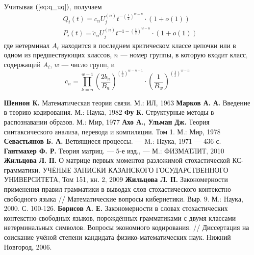 \documentclass[10pt]{article}
\begin{document}
Учитывая $(\ref{eq:q_uq})$, получаем
\begin{equation*}
	\begin{split}
		&Q_i(t) = c_n U^{(n)}_j t^{-\left(\frac{1}{2}\right)^{w-n}} \cdot (1 + o(1)) \\
		&P_i(t) = \tilde{c}_n U^{(n)}_j t^{-1 -\left(\frac{1}{2}\right)^{w-n}} \cdot (1 + o(1))
	\end{split}
\end{equation*}
где нетерминал $A_i$ находится в последнем критическом классе цепочки или в одном из предшествующих классов, $n$ --- номер группы, в которую входит класс, содержащий $A_i$, $w$ --- число групп, и
\begin{equation*}
	c_n = \prod_{k = n}^{w - 1} \left(\frac{2 b_n}{B_n}\right)^{\left(\frac{1}{2}\right)^{w - n + 1}} \cdot \left(\frac{1}{B_w}\right)^{\left(\frac{1}{2}\right)^{w - n}}
\end{equation*}


\newpage

\begin{thebibliography}{99}
	\textbf{Шеннон К.} Математическая теория связи. М.: ИЛ, 1963
	\textbf{Марков А. А.} Введение в теорию кодирования. М.: Наука, 1982
	\textbf{Фу К.} Структурные методы в распознавании образов. М.: Мир, 1977
	\textbf{Ахо А., Ульман Дж.} Теория синтаксического анализа, перевода и компиляции. Том 1. М.: Мир, 1978
	\textbf{Севастьянов Б. А.} Ветвящиеся процессы. --- M.: Наука, 1971 --- 436 с.
	\textbf{Гантмахер Ф. Р.} Теория матриц. --- 5-е изд., --- М.: ФИЗМАТЛИТ, 2010
	\textbf{Жильцова Л. П.} О матрице первых моментов разложимой стохастической КС-грамматики. УЧЁНЫЕ ЗАПИСКИ КАЗАНСКОГО ГОСУДАРСТВЕННОГО УНИВЕРСИТЕТА, Том 151, кн. 2, 2009
	\textbf{Жильцова Л. П.} Закономерности применения правил грамматики в выводах слов стохастического контекстно-свободного языка // Математические вопросы кибернетики. Выр. 9. М.: Наука, 2000. С. 100-126.
	\textbf{Борисов А. Е.} Закономерности в словах стохастических контекстно-свободных языков, порождённых грамматиками с двумя классами нетерминальных символов. Вопросы экономного кодирования. // Диссертация на соискание учёной степени кандидата физико-математических наук. Нижний Новгород, 2006.
\end{thebibliography}
\end{document}
